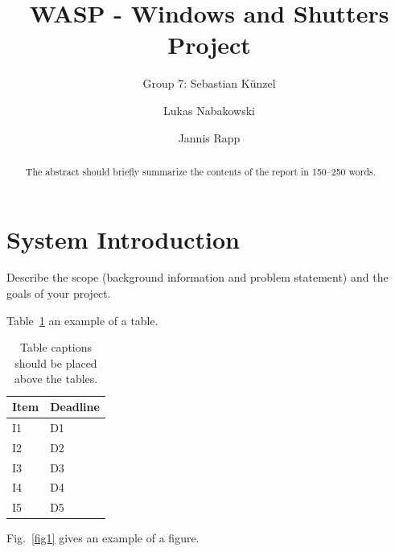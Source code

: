 \documentclass[runningheads]{llncs}
\begin{document}
%
\title{WASP - Windows and Shutters Project}

\author{Group 7: Sebastian Künzel \and
Lukas Nabakowski \and
Jannis Rapp}

%
\maketitle              %
%
\begin{abstract}
The abstract should briefly summarize the contents of the report in
150--250 words. 

\end{abstract}
%
%
%
\section{System Introduction}
Describe the scope (background information and problem statement) and the goals of your project.

Table~\ref{tab1} an example of a table.

\begin{table}
\caption{Table captions should be placed above the
tables.}\label{tab1}
\begin{tabular}{|l|l|}
\hline
Item & Deadline \\
\hline
I1 & D1 \\
I2 & D2 \\
I3 & D3 \\
I4 & D4 \\
I5 & D5 \\
\hline
\end{tabular}
\end{table}

Fig.~\ref{fig1} gives an example of a figure.
\end{document}

